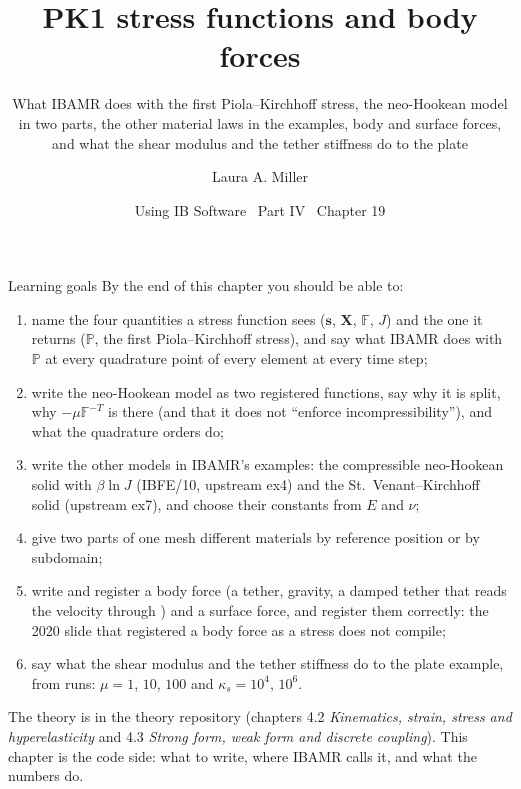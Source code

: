 \documentclass[aspectratio=169,11pt]{beamer}
\title[PK1 stress functions and body forces]{PK1 stress functions and body forces}
\subtitle{What IBAMR does with the first Piola--Kirchhoff stress, the neo-Hookean model in two parts, the other material laws in the examples, body and surface forces, and what the shear modulus and the tether stiffness do to the plate}
\author[Miller]{Laura A. Miller}
\institute[UArizona]{Department of Mathematics, University of Arizona}
\date{Using IB Software \textbullet\ Part IV \textbullet\ Chapter 19}
\begin{document}
\begin{frame}[plain]
\end{frame}

\begin{frame}{Learning goals}
\label{fr:goals}
\scriptsize By the end of this chapter you should be able to:
\begin{enumerate}
  \item name the four quantities a stress function sees ($\mathbf{s}$, $\mathbf{X}$, $\mathbb{F}$, $J$) and the one it returns ($\mathbb{P}$, the first Piola--Kirchhoff stress), and say what IBAMR does with $\mathbb{P}$ at every quadrature point of every element at every time step;
  \item write the neo-Hookean model as two registered functions, say why it is split, why $-\mu\mathbb{F}^{-T}$ is there (and that it does not ``enforce incompressibility''), and what the quadrature orders do;
  \item write the other models in IBAMR's examples: the compressible neo-Hookean solid with $\beta\ln J$ (IBFE/10, upstream ex4) and the St.\ Venant--Kirchhoff solid (upstream ex7), and choose their constants from $E$ and $\nu$;
  \item give two parts of one mesh different materials by reference position or by subdomain;
  \item write and register a body force (a tether, gravity, a damped tether that reads the velocity through ) and a surface force, and register them correctly: the 2020 slide that registered a body force as a stress does not compile;
  \item say what the shear modulus and the tether stiffness do to the plate example, from runs: $\mu = 1$, $10$, $100$ and $\kappa_s = 10^4$, $10^6$.
\end{enumerate}
\begin{punchbox}
\footnotesize The theory is in the theory repository (chapters 4.2 \emph{Kinematics, strain, stress and hyperelasticity} and 4.3 \emph{Strong form, weak form and discrete coupling}). This chapter is the code side: what to write, where IBAMR calls it, and what the numbers do.
\end{punchbox}
\end{frame}
\end{document}
